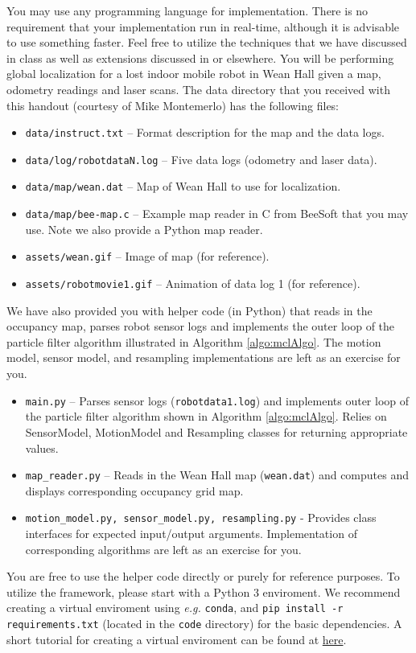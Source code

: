 \documentclass[12pt, a4paper]{article}
\begin{document}
You may use any programming language for implementation. There is
no requirement that your implementation run in real-time, although it is advisable to use something
faster. Feel free to utilize the techniques that we have
discussed in class as well as extensions discussed in \cite{thrun2005probabilistic} or elsewhere.
You will be performing global localization for a lost indoor mobile
robot in Wean Hall given a map, odometry readings and laser scans.
The data directory that you received with this handout (courtesy of
Mike Montemerlo) has the following files:
\begin{itemize}
	\item \texttt{data/instruct.txt} -- Format description for the map and the
	      data logs.
	\item \texttt{data/log/robotdataN.log} -- Five data logs (odometry and laser
	      data).
	\item \texttt{data/map/wean.dat} -- Map of Wean Hall to use for localization.
	\item \texttt{data/map/bee-map.c} -- Example map reader in C from BeeSoft that you may use. Note we also provide a Python map reader.
	\item \texttt{assets/wean.gif} -- Image of map (for reference).
	\item \texttt{assets/robotmovie1.gif} -- Animation of data log 1 (for reference).
\end{itemize}

We have also provided you with helper code (in Python) that reads
in the occupancy map, parses robot sensor logs and implements the
outer loop of the particle filter algorithm illustrated in Algorithm
\ref{algo:mclAlgo}. The motion model, sensor model, and resampling
implementations are left as an exercise for you.
\begin{itemize}
	\item \texttt{main.py} -- Parses sensor logs (\texttt{robotdata1.log})
	      and implements outer loop of the particle filter algorithm shown in
	      Algorithm \ref{algo:mclAlgo}. Relies on SensorModel, MotionModel
	      and Resampling classes for returning appropriate values.
	\item \texttt{map\_reader.py} -- Reads in the Wean Hall map (\texttt{wean.dat})
	      and computes and displays corresponding occupancy grid map.
	\item \texttt{motion\_model.py, sensor\_model.py, resampling.py} - Provides
	      class interfaces for expected input/output arguments. Implementation
	      of corresponding algorithms are left as an exercise for you.
\end{itemize}
You are free to use the helper code directly or purely for reference
purposes. To utilize the framework, please start with a Python 3 enviroment. We recommend creating a virtual enviroment
using \emph{e.g.} \texttt{conda}, and \texttt{pip install -r requirements.txt} (located in the \texttt{code} directory) for the basic dependencies. A short tutorial for creating a virtual enviroment can be found at \href{https://docs.google.com/document/d/1iAuVGllpk3RMZzBl-kGaA2AlF8Jg5cs00y0ZwkOZ08E/edit}{here}.
\end{document}
